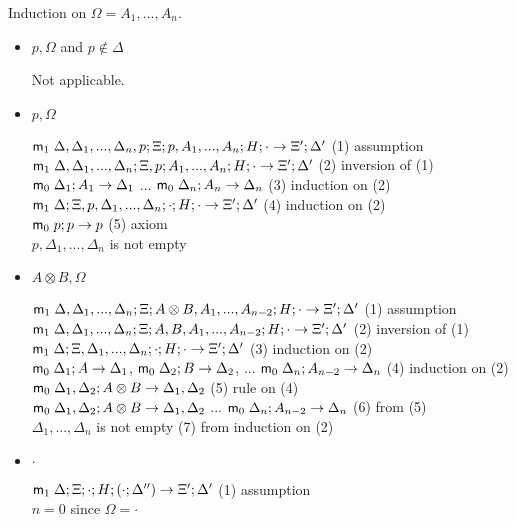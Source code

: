 \documentclass[9pt]{article}
\begin{document}
Induction on $\Omega = A_1, ..., A_n$.

\begin{itemize}
\item $p, \Omega$ and $p \notin \Delta$

Not applicable.

\item $p, \Omega$

$\mathsf{m}_1 \; \Delta, \Delta_1, ..., \Delta_n, p; \Xi; p, A_1, ..., A_n; H; \cdot \rightarrow \Xi'; \Delta'$ \hfill (1) assumption \\
$\mathsf{m}_1 \; \Delta, \Delta_1, ..., \Delta_n; \Xi, p; A_1, ..., A_n; H; \cdot \rightarrow \Xi'; \Delta'$ \hfill (2) inversion of (1) \\
$\mathsf{m}_0 \; \Delta_1 ; A_1 \rightarrow \Delta_1$ ... $\mathsf{m}_0 \; \Delta_n ; A_n \rightarrow \Delta_n$ \hfill (3) induction on (2) \\
$\mathsf{m}_1 \; \Delta; \Xi, p, \Delta_1, ..., \Delta_n; \cdot ; H ; \cdot \rightarrow \Xi'; \Delta'$ \hfill (4) induction on (2) \\
$\mathsf{m}_0 \; p; p \rightarrow p$ \hfill (5) axiom \\
$p, \Delta_1, ..., \Delta_n$ is not empty\\

\item $A \otimes B, \Omega$

$\mathsf{m}_1 \; \Delta, \Delta_1, ..., \Delta_n; \Xi; A \otimes B, A_1, ..., A_{n-2}; H; \cdot \rightarrow \Xi'; \Delta'$ \hfill (1) assumption \\
$\mathsf{m}_1 \; \Delta, \Delta_1, ..., \Delta_n; \Xi; A, B, A_1, ..., A_{n-2}; H; \cdot \rightarrow \Xi'; \Delta'$ \hfill (2) inversion of (1) \\
$\mathsf{m}_1 \; \Delta; \Xi, \Delta_1, ..., \Delta_n; \cdot ; H; \cdot \rightarrow \Xi'; \Delta'$ \hfill (3) induction on (2) \\
$\mathsf{m}_0 \; \Delta_1 ; A \rightarrow \Delta_1$, \; $\mathsf{m}_0 \; \Delta_2; B \rightarrow \Delta_2$, \; ... \; $\mathsf{m}_0 \; \Delta_n; A_{n-2} \rightarrow \Delta_n$ \hfill (4) induction on (2) \\
$\mathsf{m}_0 \; \Delta_1, \Delta_2; A \otimes B \rightarrow \Delta_1, \Delta_2$ \hfill (5) rule on (4) \\
$\mathsf{m}_0 \; \Delta_1, \Delta_2; A \otimes B \rightarrow \Delta_1, \Delta_2$ \; ... \; $\mathsf{m}_0 \; \Delta_n; A_{n-2} \rightarrow \Delta_n$ \hfill (6) from (5) \\
$\Delta_1, ..., \Delta_n$ is not empty \hfill (7) from induction on (2) \\

\item $\cdot$

$\mathsf{m}_1 \; \Delta ; \Xi; \cdot ; H; (\cdot ; \Delta'') \rightarrow \Xi'; \Delta'$ \hfill (1) assumption \\
$n = 0$ \hfill since $\Omega = \cdot$ \\

\end{itemize}
\end{document}
